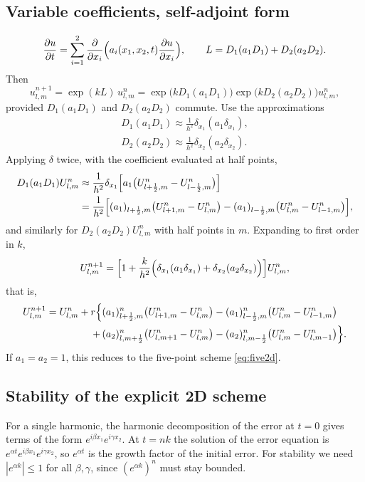 \documentclass[11pt,a4paper]{article}
\numberwithin{equation}{section}
\theoremstyle{spacedplain}
\theoremstyle{spaceddefinition}
\theoremstyle{spacedremark}
\newcommand{\pd}[2]{\frac{\partial #1}{\partial #2}}
\begin{document}
\subsection{Variable coefficients, self-adjoint form}

\[
  \pd ut=\sum_{i=1}^2\pd{}{x_i}\Bigl(a_i(x_1,x_2,t)\pd u{x_i}\Bigr),
  \qquad L=D_1(a_1D_1)+D_2(a_2D_2).
\]
Then
\[
  u_{l,m}^{n+1}=\exp(kL)\,u_{l,m}^n
  =\exp\bigl(kD_1(a_1D_1)\bigr)\exp\bigl(kD_2(a_2D_2)\bigr)u_{l,m}^n,
\]
provided \(D_1(a_1D_1)\) and \(D_2(a_2D_2)\) commute.  Use the
approximations
\[
\begin{gathered}
  D_1(a_1D_1)\approx\frac1{h^2}\delta_{x_1}(a_1\delta_{x_1}),
  \\
  D_2(a_2D_2)\approx\frac1{h^2}\delta_{x_2}(a_2\delta_{x_2}).
\end{gathered}
\]
Applying \(\delta\) twice, with the coefficient evaluated at half
points,
\begin{align*}
  D_1(a_1D_1)U_{l,m}^n
  &\approx\frac1{h^2}\delta_{x_1}\Bigl[a_1\bigl(U_{l+\frac12,m}^n
    -U_{l-\frac12,m}^n\bigr)\Bigr]\\
  &=\frac1{h^2}\Bigl[(a_1)_{l+\frac12,m}\bigl(U_{l+1,m}^n-U_{l,m}^n\bigr)
    -(a_1)_{l-\frac12,m}\bigl(U_{l,m}^n-U_{l-1,m}^n\bigr)\Bigr],
\end{align*}
and similarly for \(D_2(a_2D_2)U^n_{l,m}\) with half points in \(m\).
Expanding to first order in \(k\),
\[
  U_{l,m}^{n+1}
  =\Bigl[1+\frac k{h^2}\Bigl(\delta_{x_1}(a_1\delta_{x_1})
    +\delta_{x_2}(a_2\delta_{x_2})\Bigr)\Bigr]U_{l,m}^n,
\]
that is,
\begin{align*}
  U_{l,m}^{n+1}=U_{l,m}^n+r\Bigl\{
  &(a_1)_{l+\frac12,m}^n\bigl(U_{l+1,m}^n-U_{l,m}^n\bigr)
   -(a_1)_{l-\frac12,m}^n\bigl(U_{l,m}^n-U_{l-1,m}^n\bigr)\\
  +\,&(a_2)_{l,m+\frac12}^n\bigl(U_{l,m+1}^n-U_{l,m}^n\bigr)
   -(a_2)_{l,m-\frac12}^n\bigl(U_{l,m}^n-U_{l,m-1}^n\bigr)\Bigr\}.
\end{align*}
If \(a_1=a_2=1\), this reduces to the five-point scheme
\eqref{eq:five2d}.

\subsection{Stability of the explicit 2D scheme}

For a single harmonic, the harmonic decomposition of the error at
\(t=0\) gives terms of the form \(e^{i\beta x_1}e^{i\gamma x_2}\).  At
\(t=nk\) the solution of the error equation is
\(e^{\alpha t}e^{i\beta x_1}e^{i\gamma x_2}\), so \(e^{\alpha t}\) is
the growth factor of the initial error.  For stability we need
\(|e^{\alpha k}|\le1\) for all \(\beta,\gamma\), since
\((e^{\alpha k})^n\) must stay bounded.
\end{document}
